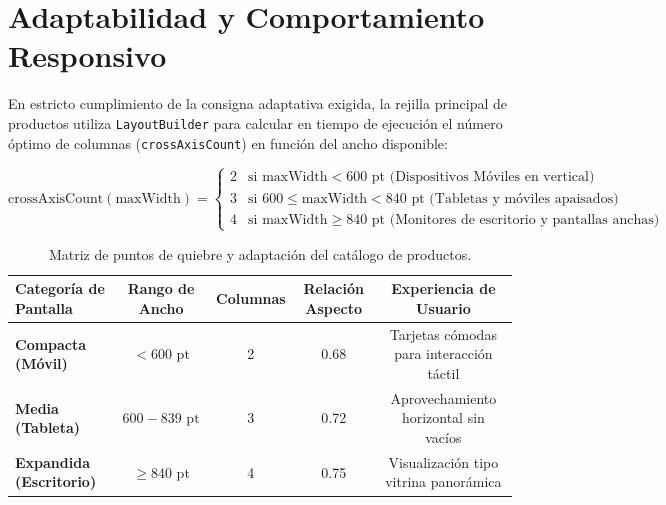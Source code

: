 \documentclass[12pt,a4paper]{article}
\begin{document}
\section{Adaptabilidad y Comportamiento Responsivo}

En estricto cumplimiento de la consigna adaptativa exigida, la rejilla principal de productos utiliza \texttt{LayoutBuilder} para calcular en tiempo de ejecución el número óptimo de columnas (\texttt{crossAxisCount}) en función del ancho disponible:

\begin{equation}
\text{crossAxisCount}(\text{maxWidth}) = 
\begin{cases} 
2 & \text{si } \text{maxWidth} < 600\text{ pt (Dispositivos Móviles en vertical)} \\
3 & \text{si } 600 \le \text{maxWidth} < 840\text{ pt (Tabletas y móviles apaisados)} \\
4 & \text{si } \text{maxWidth} \ge 840\text{ pt (Monitores de escritorio y pantallas anchas)}
\end{cases}
\end{equation}

\begin{table}[H]
\centering
\begin{tabularx}{\textwidth}{@{}lcccc@{}}
\toprule
\textbf{Categoría de Pantalla} & \textbf{Rango de Ancho} & \textbf{Columnas} & \textbf{Relación Aspecto} & \textbf{Experiencia de Usuario} \\ \midrule
\textbf{Compacta (Móvil)} & $< 600\text{ pt}$ & 2 & 0.68 & Tarjetas cómodas para interacción táctil \\
\textbf{Media (Tableta)} & $600 - 839\text{ pt}$ & 3 & 0.72 & Aprovechamiento horizontal sin vacíos \\
\textbf{Expandida (Escritorio)} & $\ge 840\text{ pt}$ & 4 & 0.75 & Visualización tipo vitrina panorámica \\ \bottomrule
\end{tabularx}
\caption{Matriz de puntos de quiebre y adaptación del catálogo de productos.}
\end{table}

\end{document}
